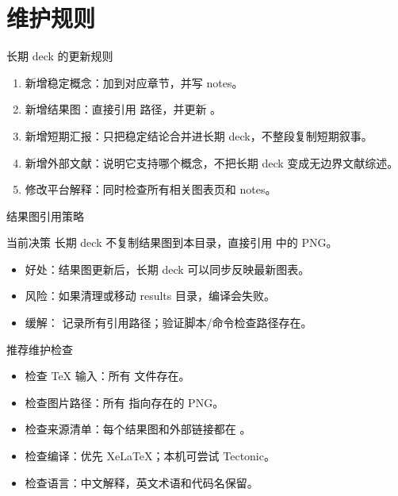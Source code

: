 \section{维护规则}

\begin{frame}{长期 deck 的更新规则}
\begin{enumerate}
  \item 新增稳定概念：加到对应章节，并写 notes。
  \item 新增结果图：直接引用  路径，并更新 。
  \item 新增短期汇报：只把稳定结论合并进长期 deck，不整段复制短期叙事。
  \item 新增外部文献：说明它支持哪个概念，不把长期 deck 变成无边界文献综述。
  \item 修改平台解释：同时检查所有相关图表页和 notes。
\end{enumerate}
\end{frame}

\begin{frame}{结果图引用策略}
\begin{block}{当前决策}
长期 deck 不复制结果图到本目录，直接引用  中的 PNG。
\end{block}
\begin{itemize}
  \item 好处：结果图更新后，长期 deck 可以同步反映最新图表。
  \item 风险：如果清理或移动 results 目录，编译会失败。
  \item 缓解： 记录所有引用路径；验证脚本/命令检查路径存在。
\end{itemize}
\end{frame}

\begin{frame}{推荐维护检查}
\begin{itemize}
  \item 检查 TeX 输入：所有  文件存在。
  \item 检查图片路径：所有  指向存在的 PNG。
  \item 检查来源清单：每个结果图和外部链接都在 。
  \item 检查编译：优先 XeLaTeX；本机可尝试 Tectonic。
  \item 检查语言：中文解释，英文术语和代码名保留。
\end{itemize}
\end{frame}

